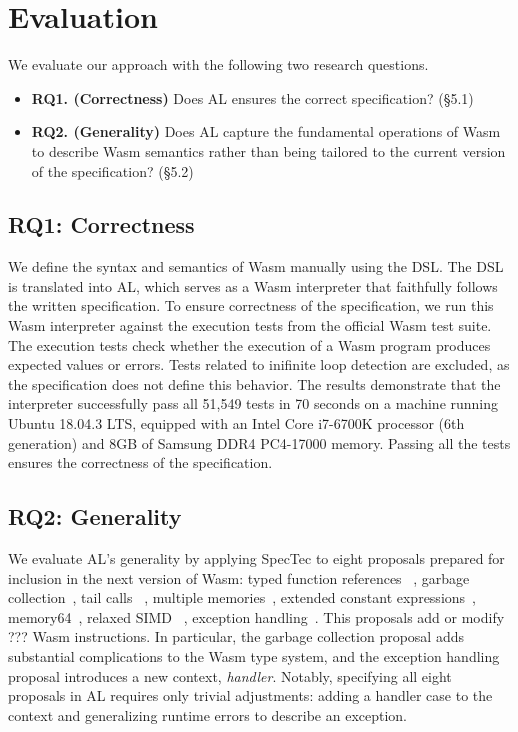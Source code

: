 
\chapter{Evaluation}
\label{ch:eval}
\noindent

We evaluate our approach with the following two research questions.
\begin{itemize}
  \item \textbf{RQ1. (Correctness)} Does AL ensures the correct specification?
    (\S 5.1)
  \item \textbf{RQ2. (Generality)} Does AL capture the fundamental operations of
    Wasm to describe Wasm semantics rather than being tailored to the current
    version of the specification? (\S 5.2)
\end{itemize}

\section{RQ1: Correctness}

We define the syntax and semantics of Wasm manually using the DSL.
The DSL is translated into AL, which serves as a Wasm interpreter that
faithfully follows the written specification.
To ensure correctness of the specification, we run this Wasm interpreter
against the execution tests from the official Wasm test suite.
The execution tests check whether the execution of a Wasm program produces
expected values or errors.
Tests related to inifinite loop detection are excluded, as the specification
does not define this behavior.
The results demonstrate that the interpreter successfully pass all 51,549 tests
in 70 seconds on a machine running Ubuntu 18.04.3 LTS, equipped with an Intel
Core i7-6700K processor (6th generation) and 8GB of Samsung DDR4 PC4-17000
memory.
Passing all the tests ensures the correctness of the specification.


\section{RQ2: Generality}
We evaluate AL's generality by applying SpecTec to eight proposals prepared for
inclusion in the next version of Wasm: typed function references
~\cite{proposal-fr}, garbage collection~\cite{propsal-gc}, tail calls
~\cite{proposal-tc}, multiple memories~\cite{proposal-mm}, extended constant
expressions~\cite{proposal-ec}, memory64~\cite{proposal-m64}, relaxed SIMD
~\cite{proposal-rs}, exception handling~\cite{proposal-eh}.
This proposals add or modify ??? Wasm instructions.
In particular, the garbage collection proposal adds substantial complications
to the Wasm type system, and the exception handling proposal introduces a new
context, \textit{handler}.
Notably, specifying all eight proposals in AL requires only trivial
adjustments: adding a handler case to the context and generalizing runtime
errors to describe an exception.

